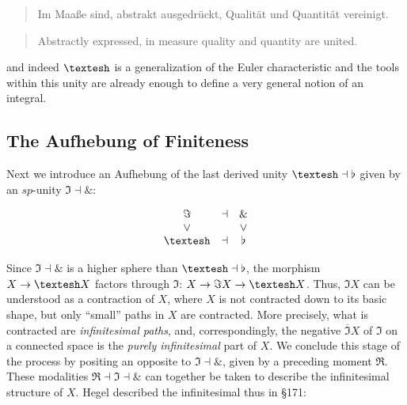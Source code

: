 \documentclass{article}
\begin{document}
\begin{quote}
    Im Maaße sind, abstrakt ausgedrückt, Qualität und Quantität vereinigt.
\end{quote}

\begin{quote}
    Abstractly expressed, in measure quality and quantity are united.
\end{quote}

and indeed $\textrm{\textesh}$ is a generalization of the Euler characteristic and the tools within this unity are already enough to define a very general notion of an integral\cite{Nlabintegral}.

\subsection{The Aufhebung of Finiteness}
Next we introduce an Aufhebung of the last derived unity $\textrm{\textesh}\dashv\flat$ given by an
$sp$-unity $ \Im\dashv\&$:


$$
  \begin{array}{ccc}
    \Im &\dashv& \&
     \\
     \vee && \vee
     \\
    \textrm{\textesh} &\dashv& \flat
    \end{array}
$$

Since $\Im\dashv\&$ is a higher sphere than $\textrm{\textesh}\dashv\flat$, the morphism $X\rightarrow
\textrm{\textesh} X$ factors through $\Im$: $X\rightarrow\Im X\rightarrow\textrm{\textesh} X$. Thus, $\Im X$
can be understood as a contraction of $X$, where $X$ is not contracted down to its basic shape, but only
``small'' paths in $X$ are contracted. More precisely, what is contracted are \emph{infinitesimal paths},
and, correspondingly, the negative $\overline{\Im} X$ of $\Im$ on a connected space is the \emph{purely
infinitesimal} part of $X$. We conclude this stage of the process by positing an opposite to $\Im\dashv\&$,
given by a preceding moment $\Re$. These modalities $\Re\dashv\Im\dashv\&$ can together be taken to describe
the infinitesimal structure of $X$. Hegel described the infinitesimal thus in §171:
\end{document}
